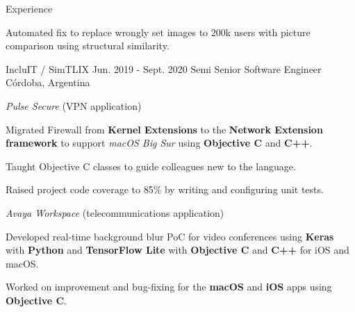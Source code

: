 \documentclass{curriculum}
\begin{document}
\begin{cvsection}{Experience}
\begin{sectionitemlist}
        \item{
            Automated fix to replace wrongly set images to 200k users with
            picture comparison using structural similarity.
        }

        \end{sectionitemlist}


    \makesectionitemheader
        {IncluIT / SimTLIX}                             {Jun. 2019 - Sept. 2020}
        {Semi Senior Software Engineer}                                {Córdoba, Argentina}

        \begin{sectionitemlist}

        \item{\textit{Pulse Secure} (VPN application)}
            \begin{sectionitemlist}
            \item{
                Migrated Firewall from \textbf{Kernel Extensions} to the
                \textbf{Network Extension framework} to support \textit{macOS Big Sur}
                using \textbf{Objective C} and \textbf{C++}.
            }
            \item{
                Taught Objective C classes to guide colleagues new to the language.
            }
            \item{
                Raised project code coverage to 85\% by writing and configuring unit tests.
            }
            \end{sectionitemlist}

        \item{\textit{Avaya Workspace} (telecommunications application)}
            \begin{sectionitemlist}
            \item{
                Developed real-time background blur PoC for video conferences using
                \textbf{Keras} with \textbf{Python} and \textbf{TensorFlow Lite}
                with \textbf{Objective C} and \textbf{C++} for iOS and macOS.
            }
            \item{
                Worked on improvement and bug-fixing for the \textbf{macOS}
                and \textbf{iOS} apps using \textbf{Objective C}.
            }
            \end{sectionitemlist}


\end{sectionitemlist}
\end{cvsection}
\end{document}
